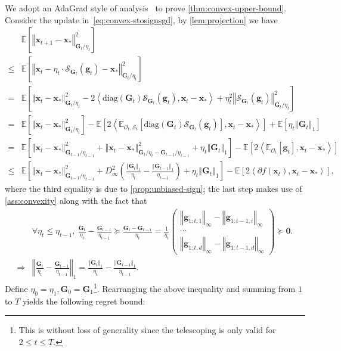 \documentclass{article}
\def \E {\mathbb{E}}
\def \x {\mathbf{x}}
\def \g {\mathbf{g}}
\def \O {\mathcal{O}}
\def \SS {\mathcal{S}}
\def \Gb {\mathbf{G}}
\newcommand{\inner}[2]{\left\langle #1, #2 \right\rangle}
\newcommand{\norm}[1]{\left\Vert#1\right\Vert}
\newcommand{\diag}[1]{\textrm{diag}\left(#1\right)}
\newcommand{\sqbrac}[1]{\left[#1\right]}
\newcommand{\brac}[1]{\left(#1\right)}
\def\0{\bm{0}}
\begin{document}
We adopt an AdaGrad style of analysis~\citep{McMahanS10adagrad,duchi2011adaptive,liu2025adagrad} to prove \cref{thm:convex-upper-bound}. Consider the update in~\eqref{eq:convex-stosignsgd}, by \cref{lem:projection} we have
\begin{align*}
    &\E\sqbrac{\norm{\x_{t+1}-\x_*}^2_{\Gb_t/\eta_t}}\\\le&\E\sqbrac{\norm{\x_{t}-\eta_t\cdot\SS_{\Gb_t}(\g_t)-\x_*}^2_{\Gb_t/\eta_t}}\\=&\E\sqbrac{\norm{\x_{t}-\x_*}^2_{\Gb_t/\eta_t}-2\inner{\diag{\Gb_t}\SS_{\Gb_t}(\g_t)}{\x_{t}-\x_*}+\eta_t^2\norm{\SS_{\Gb_t}(\g_t)}^2_{\Gb_t/\eta_t}}\\=&\E\sqbrac{\norm{\x_{t}-\x_*}^2_{\Gb_t/\eta_t}}-\E\sqbrac{2\inner{\E_{\O_t,\SS_t}\sqbrac{\diag{\Gb_t}\SS_{\Gb_t}(\g_t)}}{\x_{t}-\x_*}}+\E\sqbrac{\eta_t\norm{\Gb_t}_1}\\=&\E\sqbrac{\norm{\x_{t}-\x_*}^2_{\Gb_{t-1}/\eta_{t-1}}+\norm{\x_{t}-\x_*}^2_{\Gb_t/\eta_t-\Gb_{t-1}/\eta_{t-1}}+\eta_t\norm{\Gb_t}_1}-\E\sqbrac{2\inner{\E_{\O_t}[\g_t]}{\x_{t}-\x_*}}\\\le&\E\sqbrac{\norm{\x_{t}-\x_*}^2_{\Gb_{t-1}/\eta_{t-1}}+D_\infty^2\brac{\frac{\norm{\Gb_t}_1}{\eta_t}-\frac{\norm{\Gb_{t-1}}_1}{\eta_{t-1}}}+\eta_t\norm{\Gb_t}_1}-\E\sqbrac{2\inner{\partial f(\x_t)}{\x_{t}-\x_*}},
\end{align*}
where the third equality is due to \cref{prop:unbiased-sign}; the last step makes use of \cref{ass:convexity} along with the fact that
\begin{align*}
    &\forall\eta_t\le\eta_{t-1},\ \frac{\Gb_t}{\eta_t}-\frac{\Gb_{t-1}}{\eta_{t-1}}\succeq\frac{\Gb_t-\Gb_{t-1}}{\eta_t}=\frac{1}{\eta_t}\begin{pmatrix}
        \norm{\g_{1:t,1}}_\infty-\norm{\g_{1:t-1,i}}_\infty\\\cdots\\\norm{\g_{1:t,d}}_\infty-\norm{\g_{1:t-1,d}}_\infty
    \end{pmatrix}\succeq\0.\\\Longrightarrow&\norm{\frac{\Gb_t}{\eta_t}-\frac{\Gb_{t-1}}{\eta_{t-1}}}_1=\frac{\norm{\Gb_t}_1}{\eta_t}-\frac{\norm{\Gb_{t-1}}_1}{\eta_{t-1}}.
\end{align*}
Define $\eta_0=\eta_1,\Gb_0=\Gb_1$\footnote{This is without loss of generality since the telescoping is only valid for $2\le t\le T$.}. Rearranging the above inequality and summing from $1$ to $T$ yields the following regret bound:
\end{document}
